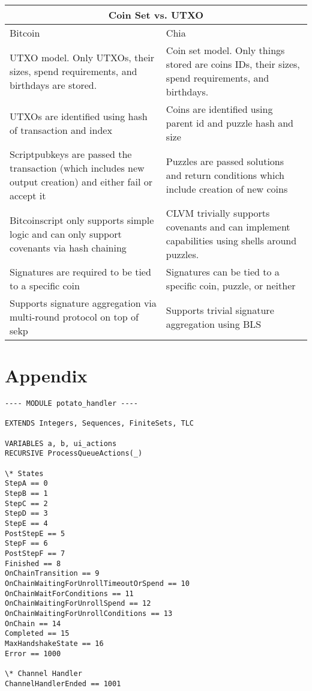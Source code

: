 \documentclass[a4paper]{article}
\begin{document}
\begin{multicols}{2}
\begin{tabular}{ |p{4cm}|p{4cm}|  }
 \hline
 \multicolumn{2}{|c|}{Coin Set vs. UTXO} \\
 \hline
 Bitcoin & Chia\\
 \hline\hline
 UTXO model. Only UTXOs, their sizes, spend requirements, and birthdays are stored. & Coin set model. Only things stored are coins IDs, their sizes, spend requirements, and birthdays.\\
 \hline
 UTXOs are identified using hash of transaction and index & Coins are identified using parent id and puzzle hash and size\\
 \hline
 Scriptpubkeys are passed the transaction (which includes new output creation) and either fail or accept it & Puzzles are passed solutions and return conditions which include creation of new coins\\
 \hline
 Bitcoinscript only supports simple logic and can only support covenants via hash chaining & CLVM trivially supports covenants and can implement capabilities using shells around puzzles.\\
 Signatures are required to be tied to a specific coin & Signatures can be tied to a specific coin, puzzle, or neither\\
 \hline
 Supports signature aggregation via multi-round protocol on top of sekp & Supports trivial signature aggregation using BLS\\
 \hline
\end{tabular}


\section{Appendix}


\onecolumn
\begin{verbatim}
---- MODULE potato_handler ----

EXTENDS Integers, Sequences, FiniteSets, TLC

VARIABLES a, b, ui_actions
RECURSIVE ProcessQueueActions(_)

\* States
StepA == 0
StepB == 1
StepC == 2
StepD == 3
StepE == 4
PostStepE == 5
StepF == 6
PostStepF == 7
Finished == 8
OnChainTransition == 9
OnChainWaitingForUnrollTimeoutOrSpend == 10
OnChainWaitForConditions == 11
OnChainWaitingForUnrollSpend == 12
OnChainWaitingForUnrollConditions == 13
OnChain == 14
Completed == 15
MaxHandshakeState == 16
Error == 1000

\* Channel Handler
ChannelHandlerEnded == 1001


\end{verbatim}
\end{multicols}
\end{document}
